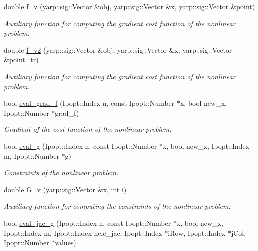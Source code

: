 \begin{DoxyCompactItemize}
double \hyperlink{classgrasping__NLP_ab67b259991b21ef9c7d1a81a3cb31228}{f\+\_\+v} (yarp\+::sig\+::\+Vector \&obj, yarp\+::sig\+::\+Vector \&x, yarp\+::sig\+::\+Vector \&point)
\begin{DoxyCompactList}\small\item\em Auxiliary function for computing the gradient cost function of the nonlinear problem. \end{DoxyCompactList}\item 
double \hyperlink{classgrasping__NLP_a2cc9996f039f3049666a39bbf0e5a5f5}{f\+\_\+v2} (yarp\+::sig\+::\+Vector \&obj, yarp\+::sig\+::\+Vector \&x, yarp\+::sig\+::\+Vector \&point\+\_\+tr)
\begin{DoxyCompactList}\small\item\em Auxiliary function for computing the gradient cost function of the nonlinear problem. \end{DoxyCompactList}\item 
bool \hyperlink{classgrasping__NLP_a91be45219cf7e32daa8934dd59295ba0}{eval\+\_\+grad\+\_\+f} (Ipopt\+::\+Index n, const Ipopt\+::\+Number $\ast$x, bool new\+\_\+x, Ipopt\+::\+Number $\ast$grad\+\_\+f)
\begin{DoxyCompactList}\small\item\em Gradient of the cost function of the nonlinear problem. \end{DoxyCompactList}\item 
bool \hyperlink{classgrasping__NLP_a5d2066df7d89a47af9d5b79940fe10ff}{eval\+\_\+g} (Ipopt\+::\+Index n, const Ipopt\+::\+Number $\ast$x, bool new\+\_\+x, Ipopt\+::\+Index m, Ipopt\+::\+Number $\ast$g)
\begin{DoxyCompactList}\small\item\em Constraints of the nonlinear problem. \end{DoxyCompactList}\item 
double \hyperlink{classgrasping__NLP_acc0ace418469386b16adb2c70a98c14d}{G\+\_\+v} (yarp\+::sig\+::\+Vector \&x, int i)
\begin{DoxyCompactList}\small\item\em Auxiliary function for computing the constraints of the nonlinear problem. \end{DoxyCompactList}\item 
bool \hyperlink{classgrasping__NLP_ab0e4e5721c5f018331ffe840022fb504}{eval\+\_\+jac\+\_\+g} (Ipopt\+::\+Index n, const Ipopt\+::\+Number $\ast$x, bool new\+\_\+x, Ipopt\+::\+Index m, Ipopt\+::\+Index nele\+\_\+jac, Ipopt\+::\+Index $\ast$i\+Row, Ipopt\+::\+Index $\ast$j\+Col, Ipopt\+::\+Number $\ast$values)

\end{DoxyCompactItemize}
